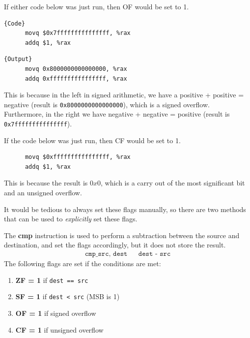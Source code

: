   \begin{example}
    If either code below was just run, then OF would be set to 1. 

    \noindent\begin{minipage}{.5\textwidth}
    \begin{lstlisting}[]{Code}
      movq $0x7fffffffffffffff, %rax 
      addq $1, %rax
    \end{lstlisting}
    \end{minipage}
    \hfill
    \begin{minipage}{.49\textwidth}
    \begin{lstlisting}[]{Output}
      movq 0x8000000000000000, %rax 
      addq 0xffffffffffffffff, %rax
    \end{lstlisting}
    \end{minipage}
    This is because in the left in signed arithmetic, we have a positive + positive = negative (result is \texttt{0x8000000000000000}), which is a signed overflow. Furthermore, in the right we have negative + negative = positive (result is \texttt{0x7fffffffffffffff}). 
  \end{example}

  \begin{example}
    If the code below was just run, then CF would be set to 1. 
    \begin{lstlisting}
      movq $0xffffffffffffffff, %rax 
      addq $1, %rax
    \end{lstlisting}
    This is because the result is $0x0$, which is a carry out of the most significant bit and an unsigned overflow.
  \end{example}

  It would be tedious to always set these flags manually, so there are two methods that can be used to \textit{explicitly} set these flags. 

  \begin{definition}[Compare]
    The \textbf{cmp} instruction is used to perform a subtraction between the source and destination, and set the flags accordingly, but it does not store the result.
    \begin{align*}
      \texttt{cmp\_ src, dest} && \texttt{dest - src} 
    \end{align*}
    The following flags are set if the conditions are met: 
    \begin{enumerate}
      \item \textbf{ZF = 1} if \texttt{dest == src} 
      \item \textbf{SF = 1} if \texttt{dest < src} (MSB is 1) 
      \item \textbf{OF = 1} if signed overflow 
      \item \textbf{CF = 1} if unsigned overflow
    \end{enumerate}
  \end{definition}

